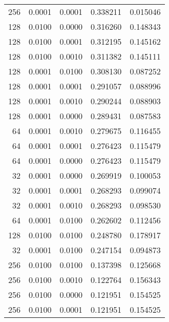 \begin{tabular}{rrrrr}
 256 &  0.0001 &  0.0001 &  0.338211 &  0.015046 \\
 128 &  0.0100 &  0.0000 &  0.316260 &  0.148343 \\
 128 &  0.0100 &  0.0001 &  0.312195 &  0.145162 \\
 128 &  0.0100 &  0.0010 &  0.311382 &  0.145111 \\
 128 &  0.0001 &  0.0100 &  0.308130 &  0.087252 \\
 128 &  0.0001 &  0.0001 &  0.291057 &  0.088996 \\
 128 &  0.0001 &  0.0010 &  0.290244 &  0.088903 \\
 128 &  0.0001 &  0.0000 &  0.289431 &  0.087583 \\
  64 &  0.0001 &  0.0010 &  0.279675 &  0.116455 \\
  64 &  0.0001 &  0.0001 &  0.276423 &  0.115479 \\
  64 &  0.0001 &  0.0000 &  0.276423 &  0.115479 \\
  32 &  0.0001 &  0.0000 &  0.269919 &  0.100053 \\
  32 &  0.0001 &  0.0001 &  0.268293 &  0.099074 \\
  32 &  0.0001 &  0.0010 &  0.268293 &  0.098530 \\
  64 &  0.0001 &  0.0100 &  0.262602 &  0.112456 \\
 128 &  0.0100 &  0.0100 &  0.248780 &  0.178917 \\
  32 &  0.0001 &  0.0100 &  0.247154 &  0.094873 \\
 256 &  0.0100 &  0.0100 &  0.137398 &  0.125668 \\
 256 &  0.0100 &  0.0010 &  0.122764 &  0.156343 \\
 256 &  0.0100 &  0.0000 &  0.121951 &  0.154525 \\
 256 &  0.0100 &  0.0001 &  0.121951 &  0.154525 \\
\bottomrule
\end{tabular}
